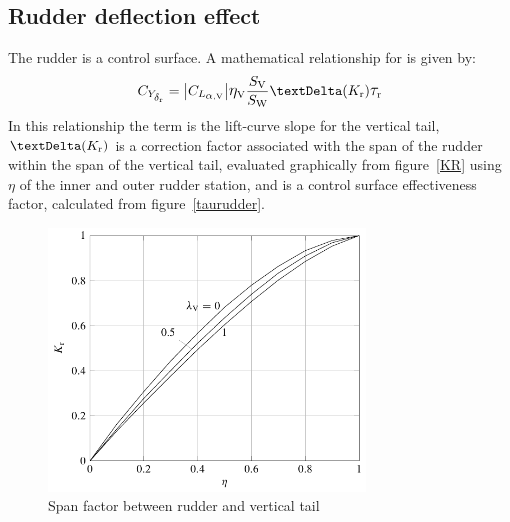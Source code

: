 \subsection{Rudder deflection effect}
\label{subsec2.1.3}

The rudder is a control surface. A mathematical relationship for \CYdeltar is given by:
\begin{equation}
\label{eq:rudderlateralforce}
\CYdeltar = \big|\CLalphaV \big| \etaV \frac{\SV}{\SW} \textrm \textDelta (K_{\textrm r}) \taurud
\end{equation}
In this relationship the term \CLalphaV is the lift-curve slope for the vertical tail, $\textrm \textDelta (K_{\textrm r})$ is a correction factor associated with the span of the rudder within the span of the vertical tail, evaluated graphically from figure~\vref{KR} using $\eta$ of the inner and outer rudder station, and \taurud is a control surface effectiveness factor, calculated from figure~\vref{taurudder}.

\begin{figure}[htbp] 
\centering
\includegraphics[width=0.75\textwidth]{Immagini/Capitolo2/4_27-KR}
\caption[Span factor rudder vertical tail] {Span factor between rudder and vertical tail}
\label{KR}
\end{figure}

